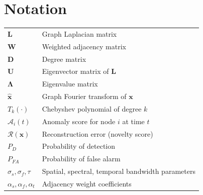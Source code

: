 \documentclass[sensors,article,submit,pdftex]{mdpi}
\newcommand{\vect}[1]{\boldsymbol{#1}}
\newcommand{\mat}[1]{\mathbf{#1}}
\begin{document}
\section*{Notation}
\noindent
\begin{tabular}{@{}ll@{}}
$\mat{L}$ & Graph Laplacian matrix \\
$\mat{W}$ & Weighted adjacency matrix \\
$\mat{D}$ & Degree matrix \\
$\mat{U}$ & Eigenvector matrix of $\mat{L}$ \\
$\mat{\Lambda}$ & Eigenvalue matrix \\
$\hat{\vect{x}}$ & Graph Fourier transform of $\vect{x}$ \\
$T_k(\cdot)$ & Chebyshev polynomial of degree $k$ \\
$\mathcal{A}_i(t)$ & Anomaly score for node $i$ at time $t$ \\
$\mathcal{R}(\vect{x})$ & Reconstruction error (novelty score) \\
$P_D$ & Probability of detection \\
$P_{FA}$ & Probability of false alarm \\
$\sigma_s, \sigma_f, \tau$ & Spatial, spectral, temporal bandwidth parameters \\
$\alpha_s, \alpha_f, \alpha_t$ & Adjacency weight coefficients \\
\end{tabular}
\end{document}
